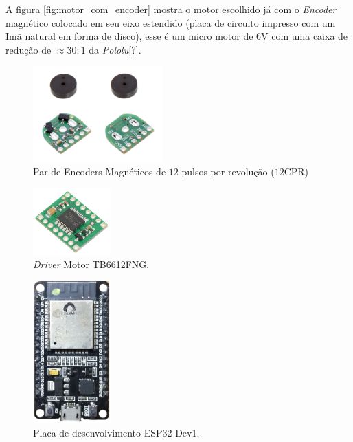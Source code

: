 A figura \ref{fig:motor_com_encoder} mostra o motor escolhido já com o \textit{Encoder} magnético colocado em seu eixo estendido (placa de circuito impresso com um Imã natural em forma de disco), esse é um micro motor de $6$V com uma caixa de redução de $\approx 30:1$ da \textit{Pololu}[?].

\begin{figure}[H]
    \centering
    \includegraphics[width=5cm]{imagens/eletronica/encoder_frente_verso.jpg}
    \caption{Par de Encoders Magnéticos de $12$ pulsos por revolução ($12$CPR)}
    \label{fig:encoder}
\end{figure}

\begin{figure}[H]
    \centering
    \includegraphics[width=3cm]{imagens/eletronica/driver.jpg}
    \caption{\textit{Driver} Motor TB6612FNG.}
    \label{fig:driver_motor}
\end{figure}

\begin{figure}[H]
    \centering
    \includegraphics[width=3cm]{imagens/eletronica/esp32_kit.png}
    \caption{Placa de desenvolvimento ESP32 Dev1.}
    \label{fig:esp32_kit}
\end{figure}

